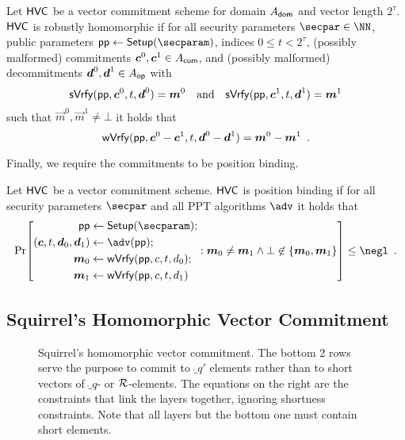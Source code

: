 \begin{definition}
  \label{def:malhomhvc}
  Let $\mathsf{HVC}$ be a vector commitment scheme for domain $A_{\mathsf{dom}}$ and vector length $2^\tau$. %
  $\mathsf{HVC}$ is robustly homomorphic if for all security parameters $\secpar\in\NN$, public parameters $\params\gets\setup(\secparam)$, indices $0\leq t < 2^\tau$, (possibly malformed) commitments $\boldsymbol{c}^0,\boldsymbol{c}^1 \in A_{\mathsf{com}}$, and (possibly malformed) decommitments $\boldsymbol{d}^0,\boldsymbol{d}^1\in A_{\mathsf{op}}$ with
  \[
    \mathsf{sVrfy}(\mathsf{pp},\boldsymbol{c}^0, t,\boldsymbol{d}^0)=\boldsymbol{m}^0 \quad \text{and} \quad \mathsf{sVrfy}(\mathsf{pp},\boldsymbol{c}^1, t,\boldsymbol{d}^1)=\boldsymbol{m}^1
  \]
  such that $\vec{m}^0,\vec{m}^1\neq \bot$ it holds that
  \[
    \mathsf{wVrfy}(\mathsf{pp},\boldsymbol{c}^0 - \boldsymbol{c}^1, t,\boldsymbol{d}^0 - \boldsymbol{d}^1)=\boldsymbol{m}^0 - \boldsymbol{m}^1\enspace.
  \]
\end{definition}
%
Finally, we require the commitments to be position binding.
\begin{definition}
  Let $\mathsf{HVC}$ be a vector commitment scheme.
  $\mathsf{HVC}$ is position binding if for all security parameters $\secpar$ and all PPT algorithms $\adv$ it holds that
  \[
    \Pr\mleft[
      \begin{aligned}
      \params\gets{}&\setup(\secparam);\\
      (\vec{c},t,\vec{d}_0,\vec{d}_1) \gets{}& \adv(\params);\\
      \vec{m}_0 \gets{}& \wverify(\params,c,t,d_0);\\
      \vec{m}_1 \gets{}& \wverify(\params,c,t,d_1)
      \end{aligned}:
      \vec{m}_0\neq \vec{m}_1 \land \bot\not\in\{\vec{m}_0,\vec{m}_1\}
    \mright]\leq \negl\enspace.
  \]
\end{definition}

\subsection{Squirrel's Homomorphic Vector Commitment}\label{subsec:squirrelrecap}

\begin{figure}[h]
{
\def\svgwidth{\textwidth}

}
\caption{Squirrel's homomorphic vector commitment. The bottom 2 rows serve the purpose to commit to $\ring_{q'}$ elements rather than to short vectors of $\ring_q$- or $\mathcal{R}$-elements. The equations on the right are the constraints that link the layers together, ignoring shortness constraints. Note that all layers but the bottom one must contain short elements.}\label{fig:squirreltree}
\end{figure}

